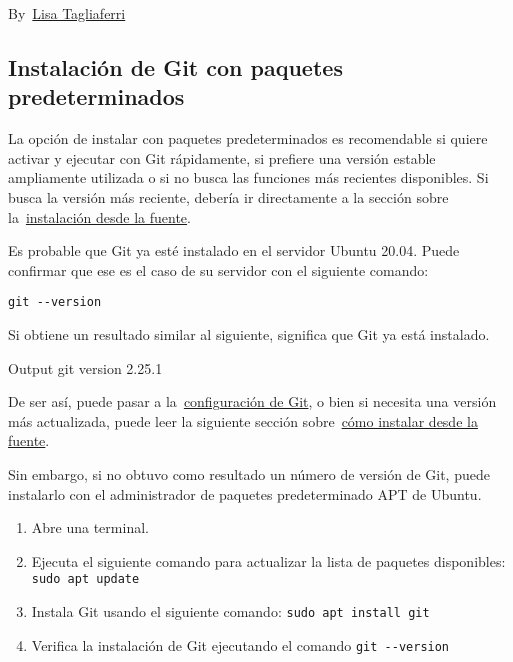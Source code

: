 \documentclass[
  a2paper,
]{article}
\providecommand{\tightlist}{%
  \setlength{\itemsep}{0pt}\setlength{\parskip}{0pt}}\usepackage{longtable,booktabs,array}
\begin{document}
By~\href{https://www.digitalocean.com/community/users/ltagliaferri}{Lisa
Tagliaferri}

\hypertarget{instalaciuxf3n-de-git-con-paquetes-predeterminados}{%
\subsection{Instalación de Git con paquetes
predeterminados}\label{instalaciuxf3n-de-git-con-paquetes-predeterminados}}

La opción de instalar con paquetes predeterminados es recomendable si
quiere activar y ejecutar con Git rápidamente, si prefiere una versión
estable ampliamente utilizada o si no busca las funciones más recientes
disponibles. Si busca la versión más reciente, debería ir directamente a
la sección sobre
la~\href{https://www.digitalocean.com/community/tutorials/how-to-install-git-on-ubuntu-20-04\#installing-git-from-source}{instalación
desde la fuente}.

Es probable que Git ya esté instalado en el servidor Ubuntu 20.04. Puede
confirmar que ese es el caso de su servidor con el siguiente comando:

\texttt{git\ -\/-version}

Si obtiene un resultado similar al siguiente, significa que Git ya está
instalado.

Output git version 2.25.1~~

De ser así, puede pasar a
la~\href{https://www.digitalocean.com/community/tutorials/how-to-install-git-on-ubuntu-20-04\#setting-up-git}{configuración
de Git}, o bien si necesita una versión más actualizada, puede leer la
siguiente sección
sobre~\href{https://www.digitalocean.com/community/tutorials/how-to-install-git-on-ubuntu-20-04\#installing-git-from-source}{cómo
instalar desde la fuente}.

Sin embargo, si no obtuvo como resultado un número de versión de Git,
puede instalarlo con el administrador de paquetes predeterminado APT de
Ubuntu.

\begin{enumerate}
\def\labelenumi{\arabic{enumi}.}
\tightlist
\item
  Abre una terminal.
\item
  Ejecuta el siguiente comando para actualizar la lista de paquetes
  disponibles: \texttt{sudo\ apt\ update}
\item
  Instala Git usando el siguiente comando:
  \texttt{sudo\ apt\ install\ git}
\item
  Verifica la instalación de Git ejecutando el comando
  \texttt{git\ -\/-version}
\end{enumerate}
\end{document}
